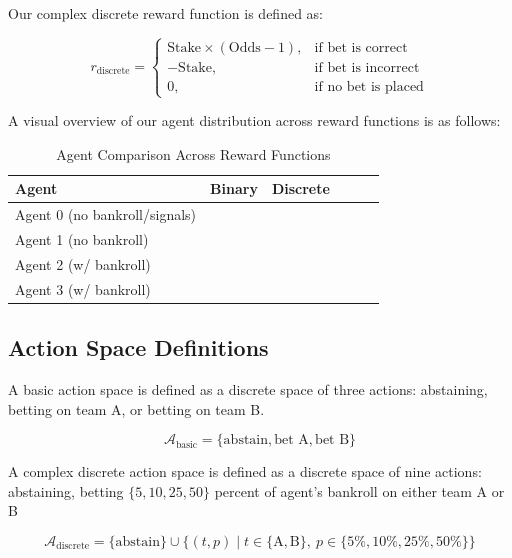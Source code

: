 \documentclass[sigconf]{acmart}
\newcommand{\cmark}{\ding{51}}
\begin{document}
Our complex discrete reward function is defined as:

\begin{equation}
r_{\text{discrete}} =
\begin{cases}
\text{Stake} \times (\text{Odds} - 1), & \text{if bet is correct} \\
-\text{Stake}, & \text{if bet is incorrect} \\
\text{0}, & \text{if no bet is placed}
\end{cases}
\end{equation}

A visual overview of our agent distribution across reward functions is as follows:

\begin{table}[h]
  \caption{Agent Comparison Across Reward Functions}
  \label{tab:agent_benchmarks}
  \begin{tabular}{lccccc}
    \toprule
    \textbf{Agent} & \textbf{Binary} & \textbf{Discrete} \\
    \midrule
    Agent 0 (no bankroll/signals)     & \cmark  &        \\
    Agent 1 (no bankroll)     & \cmark  &        \\
    Agent 2 (w/ bankroll)   &         & \cmark \\
    Agent 3 (w/ bankroll)   &         & \cmark \\
    \bottomrule
  \end{tabular}
\end{table}

\subsection{Action Space Definitions}

A basic action space is defined as a discrete space of three actions: abstaining, betting on team A, or betting on team B.

\begin{equation}
\mathcal{A}_{\text{basic}} = \{\text{abstain}, \text{bet A}, \text{bet B} \}
\end{equation}

A complex discrete action space is defined as a discrete space of nine actions: abstaining, betting $\{5, 10, 25, 50\}$ percent of agent's bankroll on either team A or B

\begin{equation}
\mathcal{A}_{\text{discrete}} = \{\text{abstain}\} \cup \{(t, p) \mid t \in \{\text{A}, \text{B}\},\ p \in \{5\%, 10\%, 25\%, 50\%\} \}
\end{equation}
\end{document}
